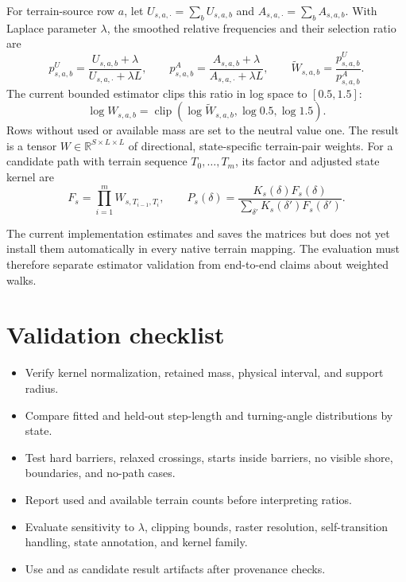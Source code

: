 For terrain-source row $a$, let $U_{s,a,\cdot}=\sum_bU_{s,a,b}$ and $A_{s,a,\cdot}=\sum_bA_{s,a,b}$. With Laplace parameter $\lambda$, the smoothed relative frequencies and their selection ratio are
\begin{equation}
  p^U_{s,a,b}=\frac{U_{s,a,b}+\lambda}{U_{s,a,\cdot}+\lambda L},
  \qquad
  p^A_{s,a,b}=\frac{A_{s,a,b}+\lambda}{A_{s,a,\cdot}+\lambda L},
  \qquad
  \widetilde W_{s,a,b}=\frac{p^U_{s,a,b}}{p^A_{s,a,b}}.
\end{equation}
The current bounded estimator clips this ratio in log space to $[0.5,1.5]$:
\begin{equation}
  \log W_{s,a,b}
  =\operatorname{clip}\!\left(
    \log\widetilde W_{s,a,b},\log 0.5,\log 1.5
  \right).
\end{equation}
Rows without used or available mass are set to the neutral value one. The result is a tensor $W\in\mathbb{R}^{S\times L\times L}$ of directional, state-specific terrain-pair weights. For a candidate path with terrain sequence $T_0,\ldots,T_m$, its factor and adjusted state kernel are
\begin{equation}
  F_s=\prod_{i=1}^{m}W_{s,T_{i-1},T_i},
  \qquad
  P_s(\delta)=\frac{K_s(\delta)F_s(\delta)}
  {\sum_{\delta'}K_s(\delta')F_s(\delta')}.
\end{equation}

The current implementation estimates and saves the matrices but does not yet install them automatically in every native terrain mapping. The evaluation must therefore separate estimator validation from end-to-end claims about weighted walks.

\section{Validation checklist}

\begin{itemize}
  \item Verify kernel normalization, retained mass, physical interval, and support radius.
  \item Compare fitted and held-out step-length and turning-angle distributions by state.
  \item Test hard barriers, relaxed crossings, starts inside barriers, no visible shore, boundaries, and no-path cases.
  \item Report used and available terrain counts before interpreting ratios.
  \item Evaluate sensitivity to $\lambda$, clipping bounds, raster resolution, self-transition handling, state annotation, and kernel family.
  \item Use  and  as candidate result artifacts after provenance checks.
\end{itemize}

